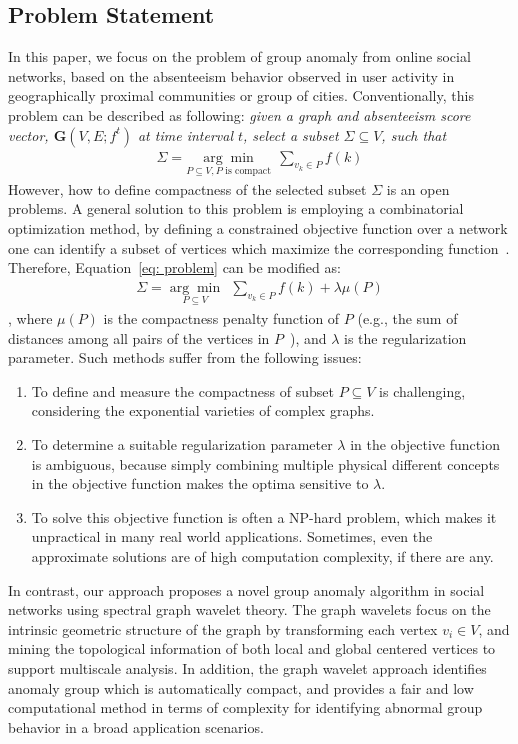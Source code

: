 \subsection{Problem Statement}
\label{sec:problemformulation}
In this paper, we focus on the problem of group anomaly from online social networks, based on the absenteeism behavior observed in user activity in geographically proximal communities or group of cities.
Conventionally, this problem can be described as following: \emph{given a graph and \textit{absenteeism score} vector, $\mathbf{G}(V,E;f^t)$ at time interval $t$, select a subset $\Sigma \subseteq V$, such that
\begin{eqnarray}
 \label{eq: problem}
    \Sigma=\underset{P\subseteq V, P \mbox{ is compact}}{\arg\min}\ \ \sum_{v_k\in P} {f(k)}
\end{eqnarray} }
However, how to define compactness of the selected subset $\Sigma$ is an open problems.
A general solution to this problem is employing a combinatorial optimization method, by defining a constrained objective function over a network one can identify a subset of vertices which maximize the corresponding function~\cite{rozenshtein2014event}. Therefore, Equation~\ref{eq: problem} can be modified as:
\begin{eqnarray}
 \label{eq: problem_conventional}
    \Sigma=\underset{P\subseteq V}{\arg\min}\ \ \sum_{v_k\in P} {f(k)}+\lambda \mu(P)
\end{eqnarray}
, where $\mu(P)$ is the compactness penalty function of $P$ (e.g., the sum of distances among
all pairs of the vertices in $P$~\cite{rozenshtein2014event}), and $\lambda$ is the regularization parameter.
Such methods suffer from the following issues:
\begin{enumerate}
\item To define and measure the compactness of subset $P\subseteq V$ is challenging, considering the exponential varieties of complex graphs.
\item To determine a suitable regularization parameter $\lambda$ in the objective function is ambiguous, because simply combining multiple physical different concepts in the objective function makes the optima sensitive to $\lambda$.
\item To solve this objective function is often a NP-hard problem, which makes it unpractical in many real world applications. Sometimes, even the approximate solutions are of high computation complexity, if there are any.
\end{enumerate}
In contrast, our approach proposes a novel group anomaly algorithm in social networks using spectral graph wavelet theory.
The graph wavelets focus on the intrinsic geometric structure of the graph by transforming each vertex $v_i\in V$, and mining the topological information of both local and global centered vertices to support multiscale analysis.
In addition, the graph wavelet approach identifies anomaly group which is automatically compact, and provides a fair and low computational method in terms of complexity for identifying abnormal group behavior in a broad application scenarios.

